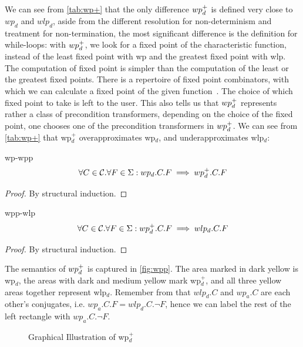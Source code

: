 We can see from \autoref{tab:wp+} that the only difference $wp_d^+$ is defined very close to $wp_d$ and $wlp_d$, aside from the different resolution for non-determinism and treatment for non-termination, the most significant difference is the definition for while-loops: with $wp_d^+$, we look for a fixed point of the characteristic function, instead of the least fixed point with wp and the greatest fixed point with wlp. 
The computation of  fixed point is simpler than the computation of the least or the greatest fixed points. 
There is a repertoire of fixed point combinators, with which we can calculate a fixed point of the given function~\cite{cardone2006history}. 
The choice of which fixed point to take is left to the user. 
This also tells us that $wp_d^+$ represents rather a class of precondition transformers, depending on the choice of the fixed point, one chooses one of the precondition transformers in $wp_d^+$. 
We can see from \autoref{tab:wp+} that wp$_d^+$ overapproximates wp$_d$, and underapproximates wlp$_d$:
\begin{lemma}{wp-wpp}
	\[\forall C\in\mathcal{C}. \forall F\in{\Sigma}: wp_d.C.F\implies wp_d^+.C.F\]
\end{lemma}
\begin{proof}
	By structural induction. 
\end{proof}
\begin{lemma}{wpp-wlp}
	\[\forall C\in\mathcal{C}. \forall F\in{\Sigma}: wp_d^+.C.F\implies wlp_d.C.F\]
\end{lemma}
\begin{proof}
	By structural induction. 
\end{proof}
The semantics of $wp_d^+$ is captured in \autoref{fig:wpp}. 
The area marked in dark yellow is wp$_d$, the areas with dark and medium yellow mark wp$_d^+$, and all three yellow areas together represent wlp$_d$. 
Remember from  that $wlp_d.C$ and $wp_a.C$ are each other's conjugates, i.e. $wp_a.C.F = wlp_d.C.\neg F$, hence we can label the rest of the left rectangle with $wp_a.C.\neg F$. 


\begin{figure}[ht]
	\centering
	
	\caption{Graphical Illustration of wp$_d^+$}
	\label{fig:wpp}
\end{figure}

